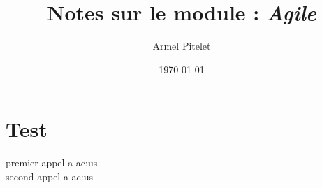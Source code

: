 \documentclass[a4paper,12pt,twoside]{article}
\title{Notes sur le module : \textit{Agile}}
\author{Armel Pitelet}
\date{\today}
\begin{document}
\maketitle
\author{}
\date{}

\tableofcontents%

\section{Test}

premier appel a \gls{ac:us}\\
second appel a \gls{ac:us}

\newpage
\printglossary[type=\acronymtype]%
\newpage
\printglossary[type = main]%
\end{document}
